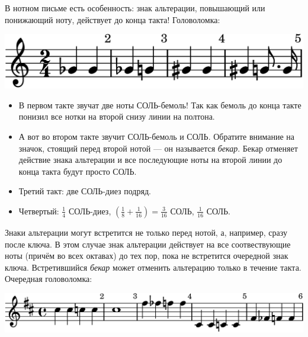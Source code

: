 В нотном письме есть особенность: знак альтерации, повышающий или понижающий ноту, действует до конца такта! Головоломка:
\begin{center}    
    \includegraphics{fig/notes/bekar}
\end{center}
\begin{itemize}
    \item В первом такте звучат две ноты СОЛЬ-бемоль! Так как бемоль до конца такте понизил все нотки на второй снизу линии на полтона.
    
    \item А вот во втором такте звучит СОЛЬ-бемоль и СОЛЬ. Обратите внимание на значок, стоящий перед второй нотой --- он называется \emph{бекар}. Бекар отменяет действие знака альтерации и все последующие ноты на второй линии до конца такта будут просто СОЛЬ.
    
    \item Третий такт: две СОЛЬ-диез подряд.
    
    \item Четвертый: $\frac{1}{4}$ СОЛЬ-диез, $(\frac{1}{8} + \frac{1}{16}) = \frac{3}{16}$ СОЛЬ, $\frac{1}{16}$ СОЛЬ.
\end{itemize}

Знаки альтерации могут встретится не только перед нотой, а, например, сразу после ключа. В этом случае знак альтерации действует на все соотвествующие ноты (причём во всех октавах) до тех пор, пока не встретится очередной знак ключа. Встретившийся \emph{бекар} может отменить альтерацию только в течение такта. Очередная головоломка:
\begin{center}    
    \includegraphics{fig/notes/tonality}
\end{center}

